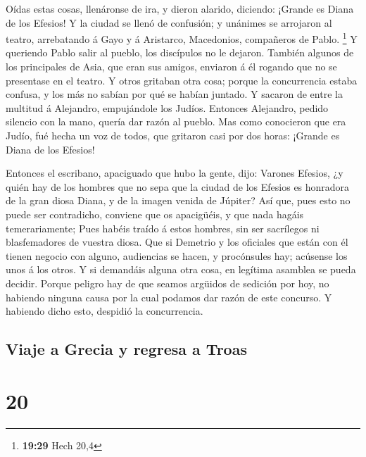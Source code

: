  Oídas estas cosas, llenáronse de ira, y dieron alarido,
diciendo: ¡Grande es Diana de los Efesios!  Y la ciudad
se llenó de confusión; y unánimes se arrojaron al teatro, arrebatando á
Gayo y á Aristarco, Macedonios, compañeros de Pablo. \footnote{\textbf{19:29}
  Hech 20,4}  Y queriendo Pablo salir al pueblo, los
discípulos no le dejaron.  También algunos de los
principales de Asia, que eran sus amigos, enviaron á él rogando que no
se presentase en el teatro.  Y otros gritaban otra cosa;
porque la concurrencia estaba confusa, y los más no sabían por qué se
habían juntado.  Y sacaron de entre la multitud á
Alejandro, empujándole los Judíos. Entonces Alejandro, pedido silencio
con la mano, quería dar razón al pueblo.  Mas como
conocieron que era Judío, fué hecha un voz de todos, que gritaron casi
por dos horas: ¡Grande es Diana de los Efesios!

 Entonces el escribano, apaciguado que hubo la gente,
dijo: Varones Efesios, ¿y quién hay de los hombres que no sepa que la
ciudad de los Efesios es honradora de la gran diosa Diana, y de la
imagen venida de Júpiter?  Así que, pues esto no puede
ser contradicho, conviene que os apacigüéis, y que nada hagáis
temerariamente;  Pues habéis traído á estos hombres, sin
ser sacrílegos ni blasfemadores de vuestra diosa.  Que si
Demetrio y los oficiales que están con él tienen negocio con alguno,
audiencias se hacen, y procónsules hay; acúsense los unos á los otros.
 Y si demandáis alguna otra cosa, en legítima asamblea se
pueda decidir.  Porque peligro hay de que seamos argüidos
de sedición por hoy, no habiendo ninguna causa por la cual podamos dar
razón de este concurso. Y habiendo dicho esto, despidió la concurrencia.

\hypertarget{viaje-a-grecia-y-regresa-a-troas}{%
\subsection{Viaje a Grecia y regresa a
Troas}\label{viaje-a-grecia-y-regresa-a-troas}}

\hypertarget{section-19}{%
\section{20}\label{section-19}}

